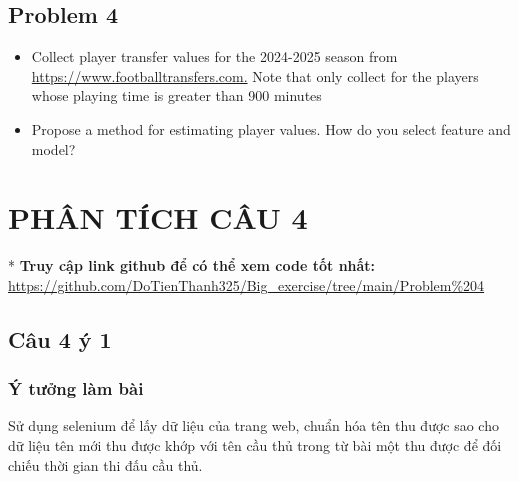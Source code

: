 \documentclass[12pt, letterpaper]{article}
\begin{document}
\subsection{Problem 4}
\begin{itemize}
    \item Collect player transfer values for the 2024-2025 season from \\
    \url{https://www.footballtransfers.com.} Note that only collect for the players whose playing
    time is greater than 900 minutes
    \item Propose a method for estimating player values. How do you select feature and model?
\end{itemize}
\cleardoublepage



\cleardoublepage



\cleardoublepage


\cleardoublepage
\section{PHÂN TÍCH CÂU 4}
\setcounter{section}{4}
* \textbf{Truy cập link github để có thể xem code tốt nhất:}  \url{https://github.com/DoTienThanh325/Big_exercise/tree/main/Problem%204}
\subsection{Câu 4 ý 1}
\subsubsection{Ý tưởng làm bài}
Sử dụng selenium để lấy dữ liệu của trang web, chuẩn hóa tên thu được sao cho dữ liệu tên mới thu được khớp với tên cầu thủ trong từ bài một thu được để đối chiếu thời gian thi đấu cầu thủ.
\end{document}
